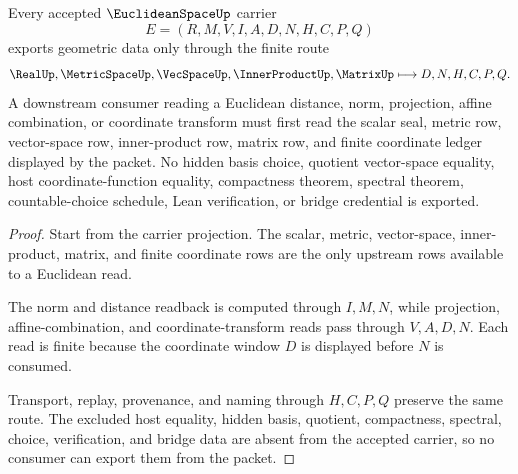 \begin{theorem}
\label{thm:euclidean-space-finite-coordinate-route}
Every accepted $\EuclideanSpaceUp$ carrier
$$
E=(R,M,V,I,A,D,N,H,C,P,Q)
$$
exports geometric data only through the finite route
$$
\RealUp,\MetricSpaceUp,\VecSpaceUp,\InnerProductUp,\MatrixUp
\longmapsto
D,N,H,C,P,Q .
$$
A downstream consumer reading a Euclidean distance, norm, projection, affine combination, or coordinate transform must first read the scalar seal, metric row, vector-space row, inner-product row, matrix row, and finite coordinate ledger displayed by the packet. No hidden basis choice, quotient vector-space equality, host coordinate-function equality, compactness theorem, spectral theorem, countable-choice schedule, Lean verification, or bridge credential is exported.
\end{theorem}
\begin{proof}
Start from the carrier projection. The scalar, metric, vector-space, inner-product, matrix, and finite coordinate rows are the only upstream rows available to a Euclidean read.

The norm and distance readback is computed through $I,M,N$, while projection, affine-combination, and coordinate-transform reads pass through $V,A,D,N$. Each read is finite because the coordinate window $D$ is displayed before $N$ is consumed.

Transport, replay, provenance, and naming through $H,C,P,Q$ preserve the same route. The excluded host equality, hidden basis, quotient, compactness, spectral, choice, verification, and bridge data are absent from the accepted carrier, so no consumer can export them from the packet.
\end{proof}


\begin{closurestatus}{\EuclideanSpaceUp}
  \theoryclosure{\seedClosure}
  \formalstatus{\unformalizedV}
\end{closurestatus}
